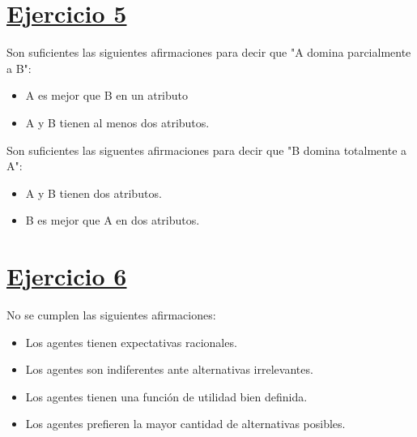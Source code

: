 \documentclass{article}
\begin{document}
    \section*{\underline{Ejercicio 5}}
        Son suficientes las siguientes afirmaciones para decir que "A domina parcialmente a B":
        \begin{itemize}
            \item A es mejor que B en un atributo
            \item A y B tienen al menos dos atributos.
        \end{itemize}
        Son suficientes las siguentes afirmaciones para decir que "B domina totalmente a A":
        \begin{itemize}
            \item A y B tienen dos atributos.
            \item B es mejor que A en dos atributos.
        \end{itemize}

    \section*{\underline{Ejercicio 6}}
        No se cumplen las siguientes afirmaciones:
        \begin{itemize}
            \item Los agentes tienen expectativas racionales.
            \item Los agentes son indiferentes ante alternativas irrelevantes.
            \item Los agentes tienen una función de utilidad bien definida.
            \item Los agentes prefieren la mayor cantidad de alternativas posibles.
        \end{itemize}
\end{document}
